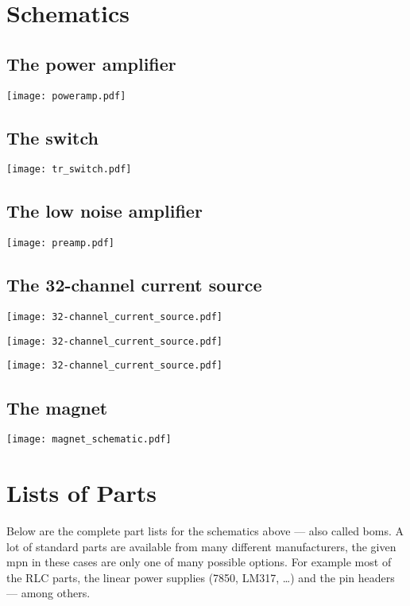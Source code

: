 \chapter{Schematics}
\section{The power amplifier}
\texttt{[image: poweramp.pdf]}

\section{The switch}
\texttt{[image: tr\_switch.pdf]}

\section{The low noise amplifier}
\texttt{[image: preamp.pdf]}

\section{The 32-channel current source}
\texttt{[image: 32-channel\_current\_source.pdf]}

\texttt{[image: 32-channel\_current\_source.pdf]}

\texttt{[image: 32-channel\_current\_source.pdf]}

\section{The magnet}
\texttt{[image: magnet\_schematic.pdf]}

\chapter{Lists of Parts}
Below are the complete part lists for the schematics above --- also called \acrshort{bom}s. A lot of standard parts are available from many different manufacturers, the given \acrfull{mpn} in these cases are only one of many possible options. For example most of the RLC parts, the linear power supplies (7850, LM317, \ldots) and the pin headers --- among others.

